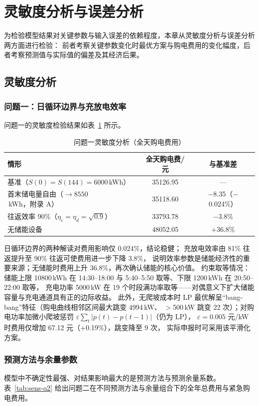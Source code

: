 \section{灵敏度分析与误差分析}

为检验模型结果对关键参数与输入误差的依赖程度，本章从灵敏度分析与误差分析两方面进行检验：
前者考察关键参数变化时最优方案与购电费用的变化幅度，后者考察预测值与实际值的偏差及其经济后果。

\subsection{灵敏度分析}

\subsubsection{问题一：日循环边界与充放电效率}
问题一的灵敏度检验结果如表~\ref{tab:sens-q1} 所示。

\begin{table}[!htbp]
\caption{问题一灵敏度分析（全天购电费用）}\label{tab:sens-q1}
\centering
\small
\begin{tabular}{lcc}
\toprule
情形 & 全天购电费/元 & 与基准差 \\
\midrule
基准（$S(0)=S(144)=6000$\,kWh） & 35126.95 & --- \\
首末储电量自由（$\to8550$\,kWh，附录 A） & 35118.60 & $-$8.35（$-$0.024\%） \\
往返效率 90\%（$\eta_c=\eta_d=\sqrt{0.9}$） & 33793.78 & $-$3.8\% \\
无储能设备 & 48052.05 & $+$36.8\% \\
\bottomrule
\end{tabular}
\end{table}

日循环边界的两种解读对费用影响仅 0.024\%，结论稳健；
充放电效率由 81\% 往返提升至 90\% 往返可使费用进一步下降 3.8\%，
说明效率参数是储能经济性的重要来源；无储能时费用上升 36.8\%，再次确认储能的核心价值。
约束取等情况：储能上限 10800\,kWh 在 14:30--18:00 与 5:40--5:50 取等、下限 1200\,kWh 在 20:50--22:00 取等，
充电功率 5000\,kW 在 19 个时段满功率取等——对偶意义下扩大储能容量与充电通道具有正的边际收益。
此外，无爬坡成本时 LP 最优解呈“bang-bang”特征（购电曲线相邻区间最大跳变 4994\,kW、
$>$500\,kW 跳变 22 次）；对购电功率加微小爬坡惩罚 $\varepsilon\sum_t|p(t)-p(t-1)|$（仍为 LP），
$\varepsilon=0.005$ 元/kW 时费用仅增加 67.12 元（$+$0.19\%），跳变降至 9 次，
实际申报时可采用该平滑化方案。

\subsubsection{预测方法与余量参数}
模型中不确定性最强、对结果影响最大的是预测方法与预测余量系数。
表~\ref{tab:sens-q2} 给出问题二在不同预测方法与余量组合下的全年总费用与紧急购电费用。

